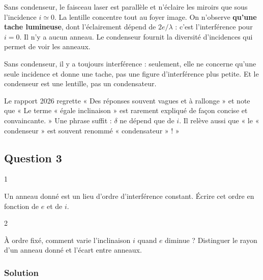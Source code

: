 \documentclass[11pt,a4paper]{article}
\begin{document}
Sans condenseur, le faisceau laser est parallèle et n'éclaire les miroirs que sous l'incidence \(i\simeq0\). La lentille concentre tout au foyer image. On n'observe \textbf{qu'une tache lumineuse}, dont l'éclairement dépend de \(2e/\lambda\) : c'est l'interférence pour \(i=0\). Il n'y a aucun anneau. Le condenseur fournit la diversité d'incidences qui permet de voir les anneaux.

\begin{piege}

Sans condenseur, il y a toujours interférence : seulement, elle ne concerne qu'une seule incidence et donne une tache, pas une figure d'interférence plus petite. Et le condenseur est une lentille, pas un condensateur.

\end{piege}

\begin{jury}

Le rapport 2026 regrette « Des réponses souvent vagues et à rallonge » et note que « Le terme « égale inclinaison » est rarement expliqué de façon concise et convaincante. » Une phrase suffit : \(\delta\) ne dépend que de \(i\). Il relève aussi que « le « condenseur » est souvent renommé « condensateur » ! »

\end{jury}

\hypertarget{question-3}{%
\subsection{Question 3}\label{question-3}}

\begin{indication}{1}

Un anneau donné est un lieu d'ordre d'interférence constant. Écrire cet ordre en fonction de \(e\) et de \(i\).

\end{indication}

\begin{indication}{2}

À ordre fixé, comment varie l'inclinaison \(i\) quand \(e\) diminue ? Distinguer le rayon d'un anneau donné et l'écart entre anneaux.

\end{indication}

\hypertarget{solution-2}{%
\subsubsection{Solution}\label{solution-2}}
\end{document}
